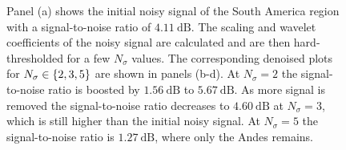 \begin{figure}[htp]
	\caption[
		A denoising demonstration for a map of South America
	]{
		Panel (a) shows the initial noisy signal of the South America region with a signal-to-noise ratio of \(\SI{4.11}{\dB}\).
		The scaling and wavelet coefficients of the noisy signal are calculated and are then hard-thresholded for a few \(N_{\sigma}\) values.
		The corresponding denoised plots for \(N_{\sigma} \in \{2, 3, 5\}\) are shown in panels (b-d).
		At \(N_{\sigma}=2\) the signal-to-noise ratio is boosted by \(\SI{1.56}{\dB}\) to \(\SI{5.67}{\dB}\).
		As more signal is removed the signal-to-noise ratio decreases to \(\SI{4.60}{\dB}\) at \(N_{\sigma}=3\), which is still higher than the initial noisy signal.
		At \(N_{\sigma}=5\) the signal-to-noise ratio is \(\SI{1.27}{\dB}\), where only the Andes remains.
	}\label{fig:chapter3_denoising}
\end{figure}
